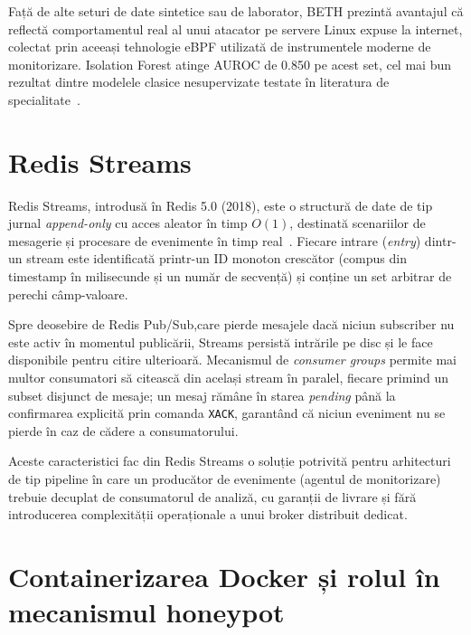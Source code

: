 Față de alte seturi de date sintetice sau de laborator, BETH prezintă avantajul că reflectă
comportamentul real al unui atacator pe servere Linux expuse la internet, colectat prin aceeași
tehnologie eBPF utilizată de instrumentele moderne de monitorizare. Isolation Forest atinge
AUROC de 0.850 pe acest set, cel mai bun rezultat dintre modelele clasice nesupervizate testate
în literatura de specialitate~\cite{highnam2021beth}.

\section{Redis Streams}

Redis Streams, introdusă în Redis 5.0 (2018), este o structură de date de tip jurnal
\textit{append-only} cu acces aleator în timp $O(1)$, destinată scenariilor de mesagerie și
procesare de evenimente în timp real~\cite{redis2024streams}. Fiecare intrare
(\textit{entry}) dintr-un stream este identificată printr-un ID monoton crescător (compus din
timestamp în milisecunde și un număr de secvență) și conține un set arbitrar de perechi
câmp-valoare.

Spre deosebire de Redis Pub/Sub,care pierde mesajele dacă niciun subscriber nu este activ
în momentul publicării, Streams persistă intrările pe disc și le face disponibile pentru citire ulterioară. Mecanismul de \textit{consumer groups}
permite mai multor consumatori să citească din același stream în paralel, fiecare primind un
subset disjunct de mesaje; un mesaj rămâne în starea \textit{pending} până la confirmarea
explicită prin comanda \texttt{XACK}, garantând că niciun eveniment nu se pierde în caz de
cădere a consumatorului.

Aceste caracteristici fac din Redis Streams o soluție potrivită pentru arhitecturi de tip
pipeline în care un producător de evenimente (agentul de monitorizare) trebuie decuplat de
consumatorul de analiză, cu garanții de livrare și fără introducerea complexității operaționale
a unui broker distribuit dedicat.

\section{Containerizarea Docker și rolul în mecanismul honeypot}

